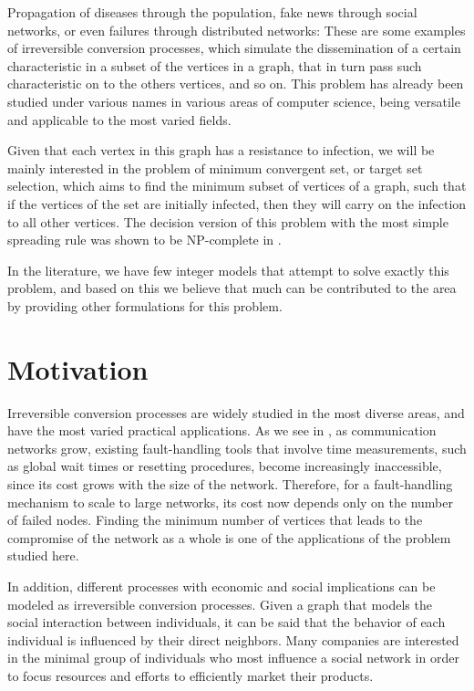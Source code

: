 
Propagation of diseases through the population, fake news through social networks, or even failures through distributed networks: These are some examples of irreversible conversion processes, which simulate the dissemination of a certain characteristic in a subset of the vertices in a graph, that in turn pass such characteristic on to the others vertices, and so on. 
This problem has already been studied under various names in various areas of computer science, being versatile and applicable to the most varied fields.

Given that each vertex in this graph has a resistance to infection, we will be mainly interested in the problem of minimum convergent set, or target set selection, which aims to find the minimum subset of vertices of a graph, such that if the vertices of the set are initially infected, then they will carry on the infection to all other vertices. The decision version of this problem with the most simple spreading rule was shown to be NP-complete in \cite{dreyer2009}.

In the literature, we have few integer models that attempt to solve exactly this problem, and based on this we believe that much can be contributed to the area by providing other formulations for this problem.  


\section{Motivation}
Irreversible conversion processes are widely studied in the most diverse areas, and have the most varied practical applications. As we see in \cite{kutten1999}, as communication networks grow, existing fault-handling tools that involve time measurements, such as global wait times or resetting procedures, become increasingly inaccessible, since its cost grows with the size of the network. Therefore, for a fault-handling mechanism to scale to large networks, its cost now depends only on the number of failed nodes. Finding the minimum number of vertices that leads to the compromise of the network as a whole is one of the applications of the problem studied here.

In addition, different processes with economic and social implications can be modeled as irreversible conversion processes. Given a graph that models the social interaction between individuals, it can be said that the behavior of each individual is influenced by their direct neighbors. Many companies are interested in the minimal group of individuals who most influence a social network in order to focus resources and efforts to efficiently market their products.

